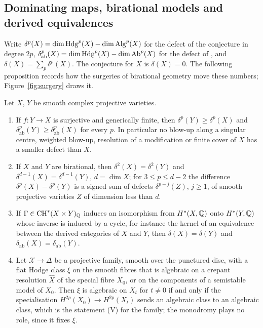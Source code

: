 \subsection{Dominating maps, birational models and derived equivalences}\label{ssec:surgery}

Write $\delta^{p}(X)=\dim\mathrm{Hdg}^{p}(X)-\dim\mathrm{Alg}^{p}(X)$ for the defect of the conjecture in degree $2p$, $\delta_{\mathrm{ab}}^{p}(X)=\dim\mathrm{Hdg}^{p}(X)-\dim\mathrm{Ab}^{p}(X)$ for the defect of \Fiii{}, and $\delta(X)=\sum_{p}\delta^{p}(X)$. The conjecture for $X$ is $\delta(X)=0$. The following proposition records how the surgeries of birational geometry move these numbers; Figure~\ref{fig:surgery} draws it.

\begin{proposition}\label{prop:surgery}
Let $X$, $Y$ be smooth complex projective varieties.
\begin{enumerate}[label=\textup{(\roman*)},leftmargin=2.4em,itemsep=2pt]
\item If $f\colon Y\to X$ is surjective and generically finite, then $\delta^{p}(Y)\ge\delta^{p}(X)$ and $\delta^{p}_{\mathrm{ab}}(Y)\ge\delta^{p}_{\mathrm{ab}}(X)$ for every $p$. In particular no blow-up along a singular centre, weighted blow-up, resolution of a modification or finite cover of $X$ has a smaller defect than $X$.
\item If $X$ and $Y$ are birational, then $\delta^{2}(X)=\delta^{2}(Y)$ and $\delta^{d-1}(X)=\delta^{d-1}(Y)$, $d=\dim X$; for $3\le p\le d-2$ the difference $\delta^{p}(X)-\delta^{p}(Y)$ is a signed sum of defects $\delta^{p-j}(Z)$, $j\ge1$, of smooth projective varieties $Z$ of dimension less than $d$.
\item If $\Gamma\in\mathrm{CH}^{*}(X\times Y)_{\mathbb{Q}}$ induces an isomorphism from $H^{*}(X,\mathbb{Q})$ onto $H^{*}(Y,\mathbb{Q})$ whose inverse is induced by a cycle, for instance the kernel of an equivalence between the derived categories of $X$ and $Y$, then $\delta(X)=\delta(Y)$ and $\delta_{\mathrm{ab}}(X)=\delta_{\mathrm{ab}}(Y)$.
\item Let $\mathcal{X}\to\Delta$ be a projective family, smooth over the punctured disc, with a flat Hodge class $\xi$ on the smooth fibres that is algebraic on a crepant resolution $\hat X$ of the special fibre $X_{0}$, or on the components of a semistable model of $X_{0}$. Then $\xi$ is algebraic on $X_{t}$ for $t\ne0$ if and only if the specialisation $H^{2p}(X_{0})\to H^{2p}(X_{t})$ sends an algebraic class to an algebraic class, which is the statement (V) for the family; the monodromy plays no role, since it fixes $\xi$.
\end{enumerate}
\end{proposition}

